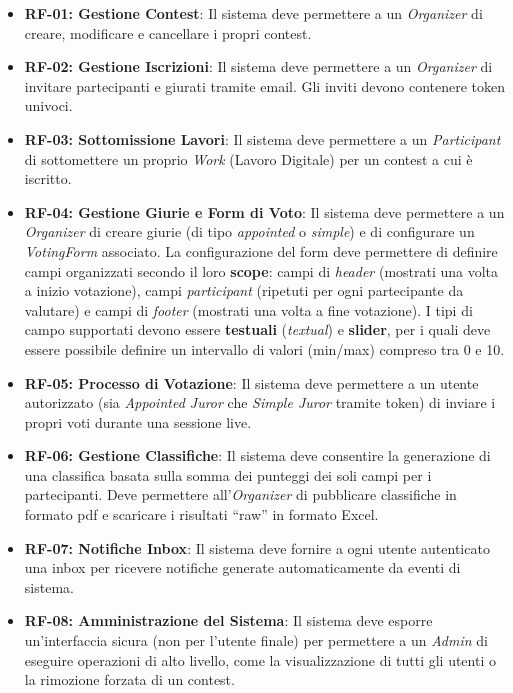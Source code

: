 \begin{itemize}
    \item \textbf{RF-01: Gestione Contest}: Il sistema deve permettere a un \emph{Organizer} di creare, modificare e cancellare i propri contest.
    \item \textbf{RF-02: Gestione Iscrizioni}: Il sistema deve permettere a un \emph{Organizer} di invitare partecipanti e giurati tramite email.
    Gli inviti devono contenere token univoci.
    \item \textbf{RF-03: Sottomissione Lavori}: Il sistema deve permettere a un \emph{Participant} di sottomettere un proprio \emph{Work} (Lavoro Digitale) per un contest a cui è iscritto.
    \item \textbf{RF-04: Gestione Giurie e Form di Voto}: Il sistema deve permettere a un \emph{Organizer} di creare giurie (di tipo \emph{appointed} o \emph{simple}) e di configurare un \emph{VotingForm} associato.
    La configurazione del form deve permettere di definire campi organizzati secondo il loro \textbf{scope}: campi di \emph{header} (mostrati una volta a inizio votazione), campi \emph{participant} (ripetuti per ogni partecipante da valutare) e campi di \emph{footer} (mostrati una volta a fine votazione).
    I tipi di campo supportati devono essere \textbf{testuali} (\emph{textual}) e \textbf{slider}, per i quali deve essere possibile definire un intervallo di valori (min/max) compreso tra 0 e 10.
    \item \textbf{RF-05: Processo di Votazione}: Il sistema deve permettere a un utente autorizzato (sia \emph{Appointed Juror} che \emph{Simple Juror} tramite token) di inviare i propri voti durante una sessione live.
    \item \textbf{RF-06: Gestione Classifiche}: Il sistema deve consentire la generazione di una classifica basata sulla somma dei punteggi dei soli campi per i partecipanti.
    Deve permettere all'\emph{Organizer} di pubblicare classifiche in formato pdf e scaricare i risultati ``raw'' in formato Excel.
    \item \textbf{RF-07: Notifiche Inbox}: Il sistema deve fornire a ogni utente autenticato una inbox per ricevere notifiche generate automaticamente da eventi di sistema.
    \item \textbf{RF-08: Amministrazione del Sistema}: Il sistema deve esporre un'interfaccia sicura (non per l'utente finale) per permettere a un \emph{Admin} di eseguire operazioni di alto livello, come la visualizzazione di tutti gli utenti o la rimozione forzata di un contest.
\end{itemize}

